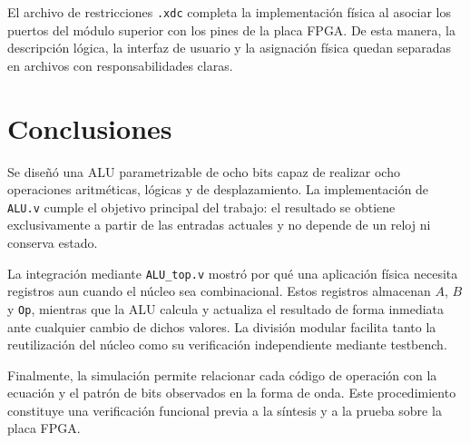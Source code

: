 \documentclass[11pt,a4paper]{article}
\newcommand{\verilog}[1]{\texttt{#1}}
\begin{document}
El archivo de restricciones \texttt{.xdc} completa la implementación física al
asociar los puertos del módulo superior con los pines de la placa FPGA. De esta
manera, la descripción lógica, la interfaz de usuario y la asignación física
quedan separadas en archivos con responsabilidades claras.

\section{Conclusiones}

Se diseñó una ALU parametrizable de ocho bits capaz de realizar ocho
operaciones aritméticas, lógicas y de desplazamiento. La implementación de
\verilog{ALU.v} cumple el objetivo principal del trabajo: el resultado se
obtiene exclusivamente a partir de las entradas actuales y no depende de un
reloj ni conserva estado.

La integración mediante \verilog{ALU\_top.v} mostró por qué una aplicación
física necesita registros aun cuando el núcleo sea combinacional. Estos
registros almacenan $A$, $B$ y \verilog{Op}, mientras que la ALU calcula y
actualiza el resultado de forma inmediata ante cualquier cambio de dichos
valores. La división modular facilita tanto la reutilización del núcleo como
su verificación independiente mediante testbench.

Finalmente, la simulación permite relacionar cada código de operación con la
ecuación y el patrón de bits observados en la forma de onda. Este procedimiento
constituye una verificación funcional previa a la síntesis y a la prueba sobre
la placa FPGA.
\end{document}
